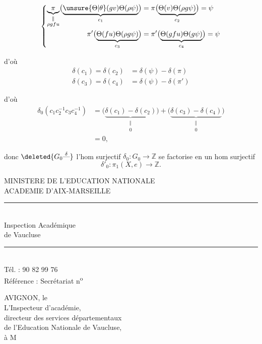 
\[
\left\{\begin{aligned}\underbrace{\pi}_{\substack{\Vert\\\rho gfu}}\bigl(\underbrace{\unsure{\Theta|\theta}(gv)\Theta(\rho\psi)}_{c_1}\bigr)&=\pi\bigl(\underbrace{\Theta(v)\Theta(\rho g\psi)}_{c_2}\bigr)=\psi\\ \pi'\bigl(\underbrace{\Theta(fu)\Theta(\rho g\psi)}_{c_3}\bigr)&=\pi'\bigl(\underbrace{\Theta(gfu)\Theta(g\psi)}_{c_4}\bigr)=\psi\end{aligned}\right.
\]

d'où
\[
\begin{aligned}\delta(c_1)=\delta(c_2)&=\delta(\psi)-\delta(\pi)\\ \delta(c_3)=\delta(c_4)&=\delta(\psi)-\delta(\pi')\end{aligned}
\]

d'où
\[
\begin{aligned}\delta_0(c_1c_2^{-1}c_3c_4^{-1})&=\bigl(\underbrace{\delta(c_1)-\delta(c_2)}_{\substack{\Vert\\0}}\bigr)+\bigl(\underbrace{\delta(c_3)-\delta(c_4)}_{\substack{\Vert\\0}}\bigr)\\ &=0,\end{aligned}
\]

donc $\deleted{G_0\overset{\delta}{\text{---}}}$ l'hom surjectif $\delta_0:G_0\longrightarrow\mathbb Z$ se factorise en un hom surjectif
\[
\delta'_0:\pi_1(X,e)\longrightarrow\mathbb Z.
\]
\par\smallskip
{\footnotesize\noindent\begin{minipage}[t]{.46\linewidth}\raggedright
MINISTERE DE L'EDUCATION NATIONALE\\ ACADEMIE D'AIX-MARSEILLE\\ \rule{2.6em}{.3pt}\\ Inspection Académique\\ de Vaucluse\\ \rule{2.6em}{.3pt}\\ Tél. : 90 82 99 76\\ Référence : Secrétariat n\textsuperscript{o}
\end{minipage}\hfill%
\begin{minipage}[t]{.51\linewidth}\raggedright
AVIGNON, le\\ L'Inspecteur d'académie,\\ directeur des services départementaux\\ de l'Education Nationale de Vaucluse,\\ à M
\end{minipage}\par}

